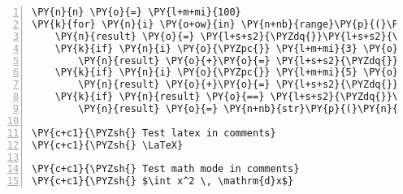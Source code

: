 \begin{Verbatim}[commandchars=\\\{\},numbers=left,firstnumber=1,stepnumber=1,codes={\catcode`\$=3\catcode`\^=7\catcode`\_=8\relax}]
\PY{n}{n} \PY{o}{=} \PY{l+m+mi}{100}
\PY{k}{for} \PY{n}{i} \PY{o+ow}{in} \PY{n+nb}{range}\PY{p}{(}\PY{l+m+mi}{1}\PY{p}{,}\PY{n}{n}\PY{o}{+}\PY{l+m+mi}{1}\PY{p}{)}\PY{p}{:}
    \PY{n}{result} \PY{o}{=} \PY{l+s+s2}{\PYZdq{}}\PY{l+s+s2}{\PYZdq{}}
    \PY{k}{if} \PY{n}{i} \PY{o}{\PYZpc{}} \PY{l+m+mi}{3} \PY{o}{==} \PY{l+m+mi}{0}\PY{p}{:}
        \PY{n}{result} \PY{o}{+}\PY{o}{=} \PY{l+s+s2}{\PYZdq{}}\PY{l+s+s2}{Fizz}\PY{l+s+s2}{\PYZdq{}}
    \PY{k}{if} \PY{n}{i} \PY{o}{\PYZpc{}} \PY{l+m+mi}{5} \PY{o}{==} \PY{l+m+mi}{0}\PY{p}{:}
        \PY{n}{result} \PY{o}{+}\PY{o}{=} \PY{l+s+s2}{\PYZdq{}}\PY{l+s+s2}{Buzz}\PY{l+s+s2}{\PYZdq{}}
    \PY{k}{if} \PY{n}{result} \PY{o}{==} \PY{l+s+s2}{\PYZdq{}}\PY{l+s+s2}{\PYZdq{}}\PY{p}{:}
        \PY{n}{result} \PY{o}{=} \PY{n+nb}{str}\PY{p}{(}\PY{n}{i}\PY{p}{)}

\PY{c+c1}{\PYZsh{} Test latex in comments}
\PY{c+c1}{\PYZsh{} \LaTeX}

\PY{c+c1}{\PYZsh{} Test math mode in comments}
\PY{c+c1}{\PYZsh{} $\int x^2 \, \mathrm{d}x$}
\end{Verbatim}
